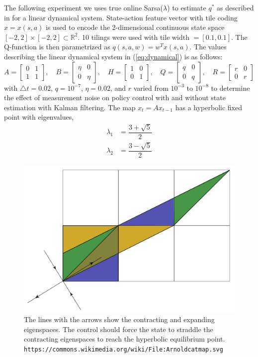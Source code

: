 \documentclass{article}
\begin{document}
The following experiment we uses true online Sarsa($\lambda$) to estimate $q^*$ as described in \cite{sutton2018reinforcement} for a linear dynamical system. State-action feature vector with tile coding $x = x(s, a)$ is used to encode the 2-dimensional continuous state space $[-2, 2] \times [-2, 2] \subset \mathbb{R}^2$. 10 tilings were used with tile width $= [0.1, 0.1]$. The Q-function is then parametrized as $q(s, a, w) = w^Tx(s,a)$. The values describing the linear dynamical system in (\ref{eq:dynamical}) is as follows:
\[
A = \begin{bmatrix}
0 & 1 \\
1 & 1
\end{bmatrix}, \quad 
B = \begin{bmatrix}
\eta & 0 \\
0 & \eta
\end{bmatrix}, \quad
H = \begin{bmatrix}
1 & 0 \\
0 & 1
\end{bmatrix}, \quad
Q = \begin{bmatrix}
q & 0 \\
0 & q
\end{bmatrix}, \quad
R = \begin{bmatrix}
r & 0 \\
0 & r
\end{bmatrix}
\]
with $\triangle t = 0.02$, $q = 10^{-7}$, $\eta = 0.02$,  and $r$ varied from $10^{-3}$ to $10^{-8}$ to determine the effect of measurement noise on policy control with and without state estimation with Kalman filtering. The map $x_t = Ax_{t-1}$ has a hyperbolic fixed point with eigenvalues,
\begin{align*}
	\lambda_1 &= \dfrac{3 + \sqrt{5}}{2} \\
	\lambda_2 &= \dfrac{3 - \sqrt{5}}{2}
\end{align*}
\begin{figure}[H]
	\includegraphics[scale=0.5]{Arnoldcatmap.png}
	\caption{The lines with the arrows show the contracting and expanding eigenspaces. The control should force the state to straddle the contracting eigenspaces to reach the hyperbolic equilibrium point.  \texttt{https://commons.wikimedia.org/wiki/File:Arnoldcatmap.svg} }
\end{figure}
\end{document}
